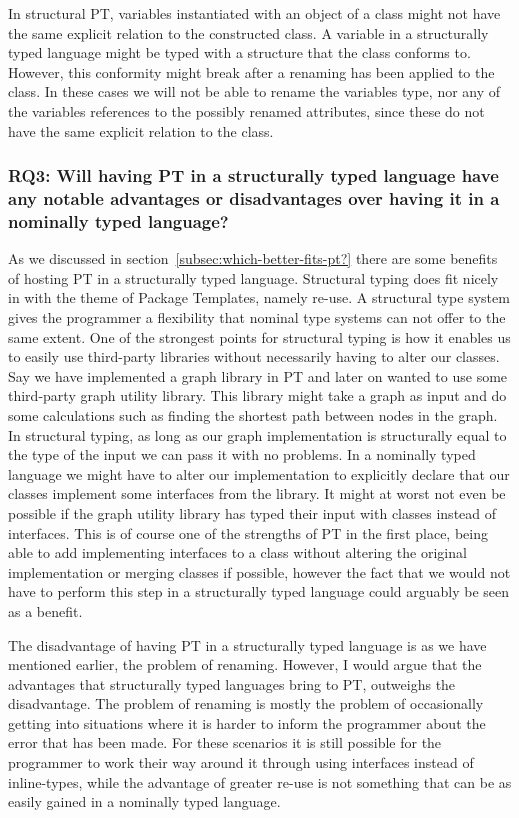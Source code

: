In structural PT, variables instantiated with an object of a class might not have the same explicit relation to the constructed class.
A variable in a structurally typed language might be typed with a structure that the class conforms to.
However, this conformity might break after a renaming has been applied to the class.
In these cases we will not be able to rename the variables type, nor any of the variables references to the possibly renamed attributes, since these do not have the same explicit relation to the class.

\subsubsection{RQ3: Will having PT in a structurally typed language have any notable advantages or disadvantages over having it in a nominally typed language?}

As we discussed in section~\vref{subsec:which-better-fits-pt?} there are some benefits of hosting PT in a structurally typed language.
Structural typing does fit nicely in with the theme of Package Templates, namely re-use.
A structural type system gives the programmer a flexibility that nominal type systems can not offer to the same extent.
One of the strongest points for structural typing is how it enables us to easily use third-party libraries without necessarily having to alter our classes.
Say we have implemented a graph library in PT and later on wanted to use some third-party graph utility library.
This library might take a graph as input and do some calculations such as finding the shortest path between nodes in the graph.
In structural typing, as long as our graph implementation is structurally equal to the type of the input we can pass it with no problems.
In a nominally typed language we might have to alter our implementation to explicitly declare that our classes implement some interfaces from the library.
It might at worst not even be possible if the graph utility library has typed their input with classes instead of interfaces.
This is of course one of the strengths of PT in the first place, being able to add implementing interfaces to a class without altering the original implementation or merging classes if possible, however the fact that we would not have to perform this step in a structurally typed language could arguably be seen as a benefit.

The disadvantage of having PT in a structurally typed language is as we have mentioned earlier, the problem of renaming.
However, I would argue that the advantages that structurally typed languages bring to PT, outweighs the disadvantage.
The problem of renaming is mostly the problem of occasionally getting into situations where it is harder to inform the programmer about the error that has been made.
For these scenarios it is still possible for the programmer to work their way around it through using interfaces instead of inline-types, while the advantage of greater re-use is not something that can be as easily gained in a nominally typed language.

